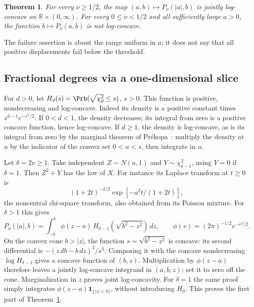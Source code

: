 \documentclass[11pt,a4paper]{article}
\numberwithin{equation}{section}
\newtheorem{theorem}{Theorem}[section]
\theoremstyle{definition}
\theoremstyle{remark}
\begin{document}
\begin{theorem}\label{r36heisei:thm}
For every \(\nu\ge1/2\), the map \((a,b)\mapsto P_\nu(|a|,b)\)
is jointly log-concave on \(\mathbb R\times(0,\infty)\). For every
\(0\le\nu<1/2\) and all sufficiently large \(a>0\), the function
\(b\mapsto P_\nu(a,b)\) is not log-concave.
\end{theorem}
The failure assertion is about the range uniform in \(a\); it does
not say that all positive displacements fail below the threshold.

\subsection{Fractional degrees via a one-dimensional slice}
For \(d>0\), let \(H_d(s)=\Prb(\sqrt{\chi^2_d}\le s)\), \(s>0\).
This function is positive, nondecreasing and log-concave. Indeed its
density is a positive constant times \(s^{d-1}e^{-s^2/2}\). If
\(0<d<1\), the density decreases; its integral from zero is a
positive concave function, hence log-concave. If \(d\ge1\), the density
is log-concave, as is its integral from zero by the marginal theorem
of Pr\'ekopa~\cite{r36heisei:Pr}: multiply the density at \(u\) by the indicator
of the convex set \(0<u<s\), then integrate in \(u\).

Let \(\delta=2\nu\ge1\). Take independent \(Z\sim N(a,1)\) and
\(Y\sim\chi^2_{\delta-1}\), using \(Y=0\) if \(\delta=1\).
Then \(Z^2+Y\) has the law of \(X\). For instance its Laplace transform
at \(t\ge0\) is
\[
(1+2t)^{-\delta/2}\exp[-a^2t/(1+2t)],
\]
the noncentral chi-square transform, also obtained from its
Poisson mixture. For \(\delta>1\) this gives
\begin{equation}\label{r36heisei:slice}
P_\nu(|a|,b)=\int_{-b}^b \phi(z-a)\,
H_{\delta-1}(\sqrt{b^2-z^2})\,dz,\qquad
\phi(v)=(2\pi)^{-1/2}e^{-v^2/2}.
\end{equation}
On the convex cone \(b>|z|\), the function \(s=\sqrt{b^2-z^2}\)
is concave: its second differential is
\(- (z\,db-b\,dz)^2/s^3\).
Composing it with the concave nondecreasing \(\log H_{\delta-1}\)
gives a concave function of \((b,z)\).
Multiplication by \(\phi(z-a)\) therefore leaves a jointly log-concave
integrand in \((a,b,z)\); set it to zero off the cone.
Marginalization in \(z\) proves joint log-concavity.
For \(\delta=1\) the same proof simply integrates
\(\phi(z-a)\mathbf1_{\{|z|<b\}}\), without introducing \(H_0\).
This proves the first part of Theorem~\ref{r36heisei:thm}.
\end{document}
